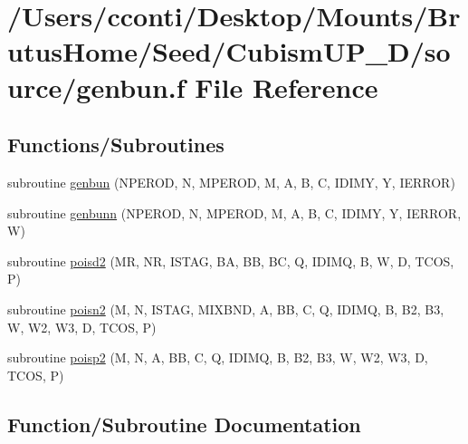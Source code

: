 \hypertarget{genbun_8f}{}\section{/\+Users/cconti/\+Desktop/\+Mounts/\+Brutus\+Home/\+Seed/\+Cubism\+U\+P\+\_\+D/source/genbun.f File Reference}
\label{genbun_8f}
\subsection*{Functions/\+Subroutines}
\begin{DoxyCompactItemize}
\item 
subroutine \hyperlink{genbun_8f_a3d194cbf4bd93aac8206ca4df3068ee9}{genbun} (N\+P\+E\+R\+O\+D, N, M\+P\+E\+R\+O\+D, M, A, B, C, I\+D\+I\+M\+Y, Y, I\+E\+R\+R\+O\+R)
\item 
subroutine \hyperlink{genbun_8f_a84efdaa64a5ea5a70e43a16b743279e9}{genbunn} (N\+P\+E\+R\+O\+D, N, M\+P\+E\+R\+O\+D, M, A, B, C, I\+D\+I\+M\+Y, Y, I\+E\+R\+R\+O\+R, W)
\item 
subroutine \hyperlink{genbun_8f_a0764fedadc183c9ff523c436a98a570c}{poisd2} (M\+R, N\+R, I\+S\+T\+A\+G, B\+A, B\+B, B\+C, Q, I\+D\+I\+M\+Q, B, W, D, T\+C\+O\+S, P)
\item 
subroutine \hyperlink{genbun_8f_a1a3286c2c2ed3988f551533a53fd6940}{poisn2} (M, N, I\+S\+T\+A\+G, M\+I\+X\+B\+N\+D, A, B\+B, C, Q, I\+D\+I\+M\+Q, B, B2, B3, W, W2, W3, D, T\+C\+O\+S, P)
\item 
subroutine \hyperlink{genbun_8f_aaa1fe08ecf01ed90ae4a2c1cf5be95ce}{poisp2} (M, N, A, B\+B, C, Q, I\+D\+I\+M\+Q, B, B2, B3, W, W2, W3, D, T\+C\+O\+S, P)
\end{DoxyCompactItemize}


\subsection{Function/\+Subroutine Documentation}
\hypertarget{genbun_8f_a3d194cbf4bd93aac8206ca4df3068ee9}{}
